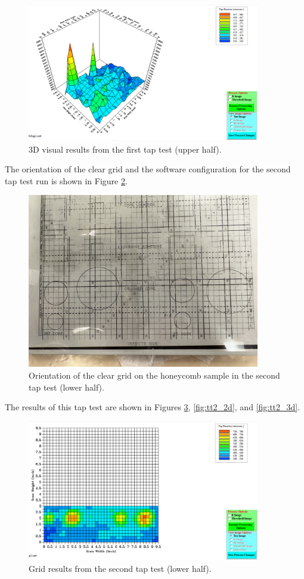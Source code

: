 \documentclass[12 pt]{report}
\begin{document}
\begin{figure}[htbp]
	\centering
	\includegraphics[width=4in]{images/graphs/tap testing/S4G2tap1-3D}
	\caption{3D visual results from the first tap test (upper half).}
	\label{fig:tt1_3d}
\end{figure}

The orientation of the clear grid and the software configuration for the second tap test run is shown in Figure \ref{fig:tt2_orientation}.

\begin{figure}[htbp]
	\centering
	\includegraphics[width=4in]{images/graphs/tap testing/S4G2tap2-orientation}
	\caption{Orientation of the clear grid on the honeycomb sample in the second tap test (lower half).}
	\label{fig:tt2_orientation}
\end{figure}

The results of this tap test are shown in Figures \ref{fig:tt2_grid}, \ref{fig:tt2_2d}, and \ref{fig:tt2_3d}.

\begin{figure}[htbp]
	\centering
	\includegraphics[width=4in]{images/graphs/tap testing/S4G2tap2-grid}
	\caption{Grid results from the second tap test (lower half).}
	\label{fig:tt2_grid}
\end{figure}
\end{document}
